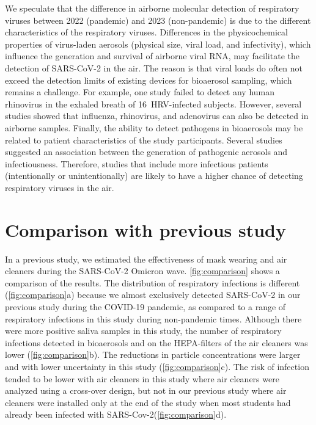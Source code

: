 
We speculate that the difference in airborne molecular detection of respiratory viruses between 2022 (pandemic) and 2023 (non-pandemic) is due to the different characteristics of the respiratory viruses. Differences in the physicochemical properties of virus-laden aerosols (\eg physical size, viral load, and infectivity), which influence the generation and survival of airborne viral RNA\cite{Wang2021,Sattar2016Book}, may facilitate the detection of SARS-CoV-2 in the air. The reason is that viral loads do often not exceed the detection limits of existing devices for bioaerosol sampling, which remains a challenge\cite{Wang2021,Belser2023PLOSPath,Bekking2019IORV,Mainelis2020AST}. For example, one study failed to detect any human rhinovirus in the exhaled breath of 16~HRV-infected subjects\cite{Fabian2011JAMPDD}. However, several studies showed that influenza\cite{Bischoff2013JID,Pan2017mSphere}, rhinovirus\cite{Myatt2004AJRCCM}, and adenovirus\cite{Nguyen2017OFID,Pan2017mSphere} can also be detected in airborne samples. Finally, the ability to detect pathogens in bioaerosols may be related to patient characteristics of the study participants. Several studies suggested an association between the generation of pathogenic aerosols and infectiousness\cite{Leung2020NatMed,Bischoff2013JID,Escombe2008PLoSMed}. Therefore, studies that include more infectious patients (intentionally or unintentionally) are likely to have a higher chance of detecting respiratory viruses in the air. 


\section{Comparison with previous study}\label{sec:comparison-prev-study}


In a previous study\cite{Banholzer2023PLoSMed}, we estimated the effectiveness of mask wearing and air cleaners during the SARS-CoV-2 Omicron wave. \cref{fig:comparison} shows a comparison of the results. The distribution of respiratory infections is different (\cref{fig:comparison}a) because we almost exclusively detected SARS-CoV-2 in our previous study during the COVID-19 pandemic, as compared to a range of respiratory infections in this study during non-pandemic times. Although there were more positive saliva samples in this study, the number of respiratory infections detected in bioaerosols and on the HEPA-filters of the air cleaners was lower (\cref{fig:comparison}b).
The reductions in particle concentrations were larger and with lower uncertainty in this study (\cref{fig:comparison}c). The risk of infection tended to be lower with air cleaners in this study where air cleaners were analyzed using a cross-over design, but not in our previous study where air cleaners were installed only at the end of the study when most students had already been infected with SARS-Cov-2(\cref{fig:comparison}d).

